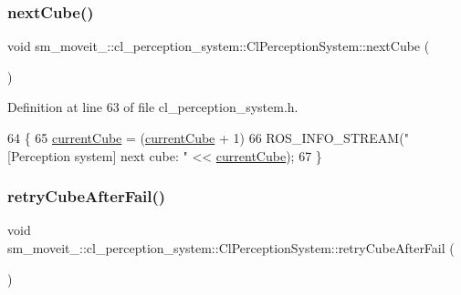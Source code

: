 \subsubsection{\texorpdfstring{next\+Cube()}{nextCube()}}
{\footnotesize\ttfamily void sm\+\_\+moveit\+\_\+::cl\+\_\+perception\+\_\+system\+::\+Cl\+Perception\+System\+::next\+Cube (\begin{DoxyParamCaption}{ }\end{DoxyParamCaption})\hspace{0.3cm}{\ttfamily [inline]}}



Definition at line 63 of file cl\+\_\+perception\+\_\+system.\+h.


\begin{DoxyCode}
64             \{
65                 \hyperlink{classsm__moveit__4_1_1cl__perception__system_1_1ClPerceptionSystem_ae2a80b803814af8b3c87f810f2728af0}{currentCube} = (\hyperlink{classsm__moveit__4_1_1cl__perception__system_1_1ClPerceptionSystem_ae2a80b803814af8b3c87f810f2728af0}{currentCube} + 1) %
66                 ROS\_INFO\_STREAM(\textcolor{stringliteral}{"[Perception system] next cube: "} << \hyperlink{classsm__moveit__4_1_1cl__perception__system_1_1ClPerceptionSystem_ae2a80b803814af8b3c87f810f2728af0}{currentCube});
67             \}
\end{DoxyCode}
\mbox{\label{classsm__moveit__4_1_1cl__perception__system_1_1ClPerceptionSystem_a060df4809e44b378878819c884e86fb8}} 
\subsubsection{\texorpdfstring{retry\+Cube\+After\+Fail()}{retryCubeAfterFail()}}
{\footnotesize\ttfamily void sm\+\_\+moveit\+\_\+::cl\+\_\+perception\+\_\+system\+::\+Cl\+Perception\+System\+::retry\+Cube\+After\+Fail (\begin{DoxyParamCaption}{ }\end{DoxyParamCaption})\hspace{0.3cm}{\ttfamily [inline]}}



